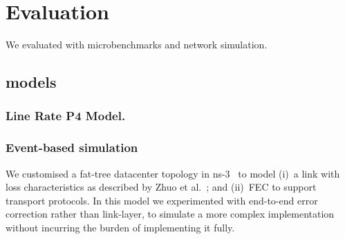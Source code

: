 \section{Evaluation}
\label{sec:evaluation}

We evaluated \OurSys with microbenchmarks and network simulation.







\subsection{\OurSys models}

\subsubsection{Line Rate P4 Model.} 




\subsubsection{Event-based simulation}
We customised a fat-tree datacenter topology in ns-3~\cite{ns3-dcn} to
model (i)~a link with loss characteristics as described by Zhuo et
al.~\cite{Zhuo:2017:UMP:3098822.3098849}; and (ii)~FEC to support
transport protocols. In this model we experimented with end-to-end
error correction rather than link-layer, to simulate a more complex
implementation without incurring the burden of implementing it fully.

